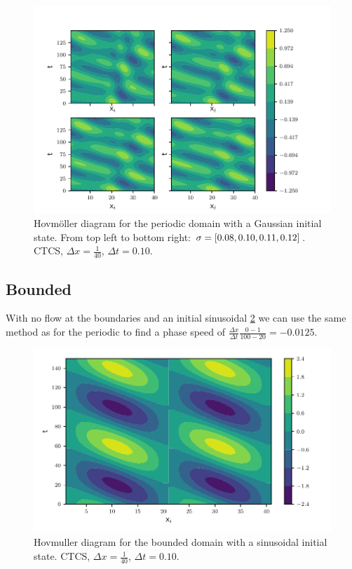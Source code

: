\begin{figure}[htp]
  \centering
  \includegraphics[width=\textwidth]{../figures/hovmuller_sigma.pdf}
  \caption{Hovmöller diagram for the periodic domain with a Gaussian initial
  state.
  From top left to bottom right: $\sigma = \left[0.08, 0.10, 0.11, 0.12\right]$. CTCS, $\Delta x = \frac{1}{40}$, $\Delta t = 0.10$.
  }
  \label{fig:periodic_gauss}
\end{figure}



\subsection{Bounded}

With no flow at the boundaries and an initial sinusoidal \cref{fig:bounded_sine}
we can use the same method as for the periodic to find a phase speed of
$\frac{\Delta x}{\Delta t} \frac{0 -1}{100 - 20} = -0.0125$.


\begin{figure}[htp]
  \centering
  \includegraphics[width=\textwidth]{../figures/psi_bounded_centered_sine.pdf}
  \caption{Hovmuller diagram for the bounded domain with a sinusoidal initial
  state. CTCS, $\Delta x = \frac{1}{40}$, $\Delta t = 0.10$.}
  \label{fig:bounded_sine}
\end{figure}



